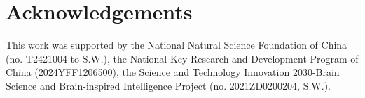 \documentclass{article}
\theoremstyle{plain}
\theoremstyle{definition}
\theoremstyle{remark}
\begin{document}
\section*{Acknowledgements}
This work was supported by the National Natural Science Foundation of China (no. T2421004 to S.W.), the National Key Research and Development Program of China (2024YFF1206500), the Science and Technology Innovation 2030-Brain Science and Brain-inspired Intelligence Project (no. 2021ZD0200204, S.W.).





\newpage
\appendix
\onecolumn

\end{document}
